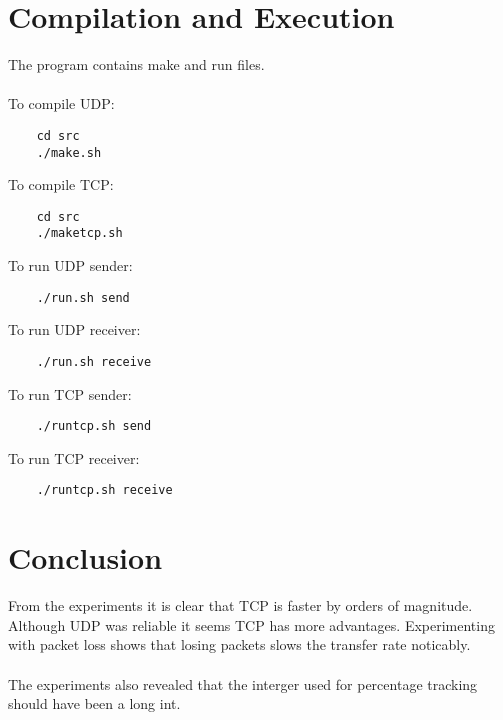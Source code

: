 \documentclass[a4paper,10pt]{article}
\begin{document}
\section{Compilation and Execution}
The program contains make and run files.\\\\
To compile UDP:
\begin{verbatim}
	cd src
	./make.sh
\end{verbatim}
To compile TCP:
\begin{verbatim}
	cd src
	./maketcp.sh
\end{verbatim}
To run UDP sender:
\begin{verbatim}
	./run.sh send
\end{verbatim}
To run UDP receiver:
\begin{verbatim}
	./run.sh receive
\end{verbatim}
To run TCP sender:
\begin{verbatim}
	./runtcp.sh send
\end{verbatim}
To run TCP receiver:
\begin{verbatim}
	./runtcp.sh receive
\end{verbatim}

\section{Conclusion}
From the experiments it is clear that TCP is faster by orders of magnitude.
Although UDP was reliable it seems TCP has more advantages.
Experimenting with packet loss shows that losing packets slows the transfer
rate noticably.\\\\
The experiments also revealed that the interger used for percentage tracking
should have been a long int.

\pagebreak


\end{document}
